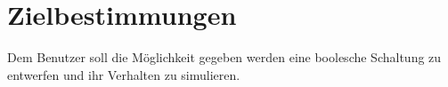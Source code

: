 \section{Zielbestimmungen}


Dem Benutzer soll die Möglichkeit gegeben werden eine boolesche Schaltung zu entwerfen und ihr Verhalten zu simulieren.